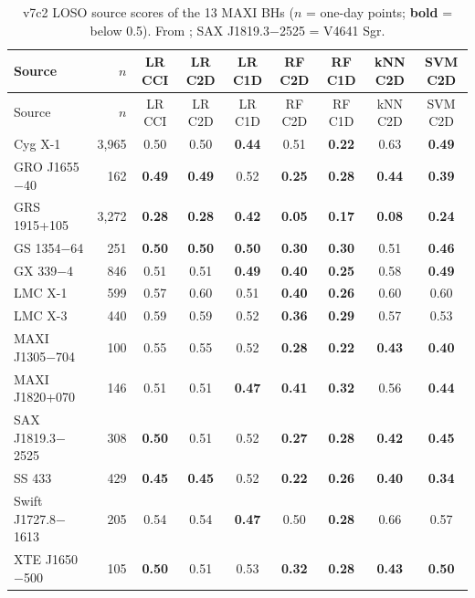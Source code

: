 {\footnotesize\setlength{\tabcolsep}{3.5pt}
\begin{longtable}{@{}lr*{7}{c}@{}}
\caption[MAXI BH scores]{v7c2 LOSO source scores of the 13 MAXI BHs ($n$ = one-day points; \textbf{bold} = below 0.5). From
; SAX J1819.3$-$2525 = V4641 Sgr.}\label{tab:p4maxibh}\\
\toprule
Source & $n$ & LR CCI & LR C2D & LR C1D & RF C2D & RF C1D & kNN C2D & SVM C2D \\
\midrule\endfirsthead
\toprule Source & $n$ & LR CCI & LR C2D & LR C1D & RF C2D & RF C1D & kNN C2D & SVM C2D \\ \midrule\endhead
\bottomrule\endfoot
Cyg X-1 & 3,965 & 0.50 & 0.50 & \textbf{0.44} & 0.51 & \textbf{0.22} & 0.63 & \textbf{0.49} \\
GRO J1655$-$40 & 162 & \textbf{0.49} & \textbf{0.49} & 0.52 & \textbf{0.25} & \textbf{0.28} & \textbf{0.44} & \textbf{0.39} \\
GRS 1915+105 & 3,272 & \textbf{0.28} & \textbf{0.28} & \textbf{0.42} & \textbf{0.05} & \textbf{0.17} & \textbf{0.08} & \textbf{0.24} \\
GS 1354$-$64 & 251 & \textbf{0.50} & \textbf{0.50} & \textbf{0.50} & \textbf{0.30} & \textbf{0.30} & 0.51 & \textbf{0.46} \\
GX 339$-$4 & 846 & 0.51 & 0.51 & \textbf{0.49} & \textbf{0.40} & \textbf{0.25} & 0.58 & \textbf{0.49} \\
LMC X-1 & 599 & 0.57 & 0.60 & 0.51 & \textbf{0.40} & \textbf{0.26} & 0.60 & 0.60 \\
LMC X-3 & 440 & 0.59 & 0.59 & 0.52 & \textbf{0.36} & \textbf{0.29} & 0.57 & 0.53 \\
MAXI J1305$-$704 & 100 & 0.55 & 0.55 & 0.52 & \textbf{0.28} & \textbf{0.22} & \textbf{0.43} & \textbf{0.40} \\
MAXI J1820+070 & 146 & 0.51 & 0.51 & \textbf{0.47} & \textbf{0.41} & \textbf{0.32} & 0.56 & \textbf{0.44} \\
SAX J1819.3$-$2525 & 308 & \textbf{0.50} & 0.51 & 0.52 & \textbf{0.27} & \textbf{0.28} & \textbf{0.42} & \textbf{0.45} \\
SS 433 & 429 & \textbf{0.45} & \textbf{0.45} & 0.52 & \textbf{0.22} & \textbf{0.26} & \textbf{0.40} & \textbf{0.34} \\
Swift J1727.8$-$1613 & 205 & 0.54 & 0.54 & \textbf{0.47} & 0.50 & \textbf{0.28} & 0.66 & 0.57 \\
XTE J1650$-$500 & 105 & \textbf{0.50} & 0.51 & 0.53 & \textbf{0.32} & \textbf{0.28} & \textbf{0.43} & \textbf{0.50} \\
\end{longtable}}

